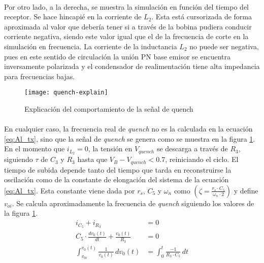 \paragraph{}
Por otro lado, a la derecha, se muestra la simulación en función del tiempo del receptor. Se hace hincapié en la corriente de $L_2$. Esta está cursorizada de forma aproximada al valor que debería tener si a través de la bobina pudiera conducir corriente negativa, siendo este valor igual que el de la frecuencia de corte en la simulaci\'on en frecuencia.
La corriente de la inductancia $L_2$ no puede ser negativa, pues en este sentido de circulación la unión PN base emisor se encuentra inversamente polarizada y el condensador de realimentación tiene alta impedancia para frecuencias bajas. 

\begin{figure}[h!]
    \centering
    \texttt{[image: quench-explain]}
    \caption{Explicación del comportamiento de la señal de quench}
    \label{fig:quench-explain}
\end{figure}

\paragraph{}
En cualquier caso, la frecuencia real de \textit{quench} no es la calculada en la ecuaci\'on \ref{eq:Al_tx}, sino que la señal de \textit{quench} se genera como se muestra en la figura \ref{fig:quench-explain}. 
En el momento que $i_{L_2} = 0$, la tensión en $V_{quench}$ se descarga a trav\'es de $R_3$, siguiendo $\tau$ de $C_3$ y $R_3$ hasta que $V_B - V_{quench} < 0.7$, reiniciando el ciclo.
El tiempo de subida depende tanto del tiempo que tarda en reconstruirse la oscilaci\'on como de la constante de elongación del sistema de la ecuación \ref{eq:Al_tx}. Esta constante viene dada por $r_s$, $C_5$ y $\omega_n$ como $\left(\zeta = \frac{r_s \cdot C_5}{\omega_n \cdot 2}\right)$ y define $v_{oi}$.
Se calcula aproximadamente la frecuencia de \textit{quench} siguiendo los valores de la figura \ref{fig:quench-explain}. 
\begin{align*} 
   i_{C_5} + i_{R_3} &= 0 \\
   C_5 \cdot \frac{dv_0(t)}{dt} + \frac{v_0(t)}{R_3} &= 0 \\
   \int_{v_{0i}}^{v_0(t)} \frac{1}{v_0(t)} \, dv_0(t) &= \int_{0}^{t} \frac{-1}{R_3 \cdot C_5} \, dt \\
\end{align*}

